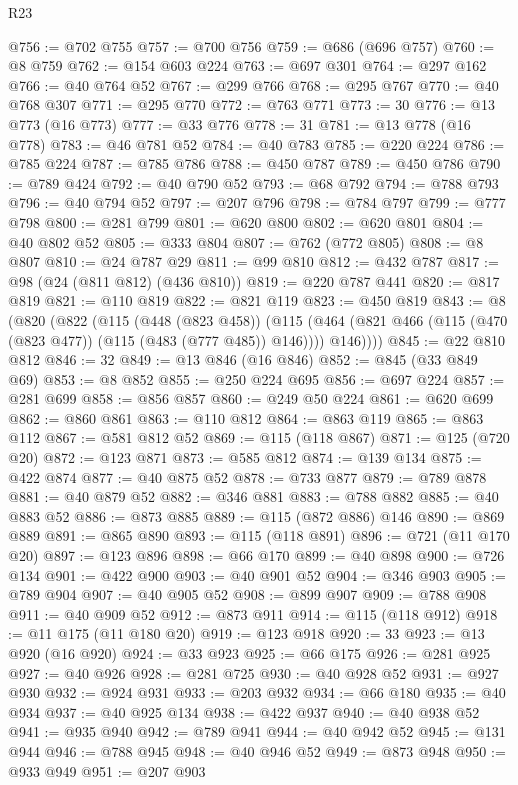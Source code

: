 \begin{lexlean}{R23}
\begin{coremodule}
@756 := @702 @755
@757 := @700 @756
@759 := @686 (@696 @757)
@760 := @8 @759
@762 := @154 @603 @224
@763 := @697 @301
@764 := @297 @162
@766 := @40 @764 @52
@767 := @299 @766
@768 := @295 @767
@770 := @40 @768 @307
@771 := @295 @770
@772 := @763 @771
@773 := 30
@776 := @13 @773 (@16 @773)
@777 := @33 @776
@778 := 31
@781 := @13 @778 (@16 @778)
@783 := @46 @781 @52
@784 := @40 @783
@785 := @220 @224
@786 := @785 @224
@787 := @785 @786
@788 := @450 @787
@789 := @450 @786
@790 := @789 @424
@792 := @40 @790 @52
@793 := @68 @792
@794 := @788 @793
@796 := @40 @794 @52
@797 := @207 @796
@798 := @784 @797
@799 := @777 @798
@800 := @281 @799
@801 := @620 @800
@802 := @620 @801
@804 := @40 @802 @52
@805 := @333 @804
@807 := @762 (@772 @805)
@808 := @8 @807
@810 := @24 @787 @29
@811 := @99 @810
@812 := @432 @787
@817 := @98 (@24 (@811 @812) (@436 @810))
@819 := @220 @787 @441
@820 := @817 @819
@821 := @110 @819
@822 := @821 @119
@823 := @450 @819
@843 := @8
    (@820
      (@822
        (@115
          (@448 (@823 @458))
          (@115 (@464 (@821 @466 (@115 (@470 (@823 @477)) (@115 (@483 (@777 @485)) @146)))) @146))))
@845 := @22 @810 @812
@846 := 32
@849 := @13 @846 (@16 @846)
@852 := @845 (@33 @849 @69)
@853 := @8 @852
@855 := @250 @224 @695
@856 := @697 @224
@857 := @281 @699
@858 := @856 @857
@860 := @249 @50 @224
@861 := @620 @699
@862 := @860 @861
@863 := @110 @812
@864 := @863 @119
@865 := @863 @112
@867 := @581 @812 @52
@869 := @115 (@118 @867)
@871 := @125 (@720 @20)
@872 := @123 @871
@873 := @585 @812
@874 := @139 @134
@875 := @422 @874
@877 := @40 @875 @52
@878 := @733 @877
@879 := @789 @878
@881 := @40 @879 @52
@882 := @346 @881
@883 := @788 @882
@885 := @40 @883 @52
@886 := @873 @885
@889 := @115 (@872 @886) @146
@890 := @869 @889
@891 := @865 @890
@893 := @115 (@118 @891)
@896 := @721 (@11 @170 @20)
@897 := @123 @896
@898 := @66 @170
@899 := @40 @898
@900 := @726 @134
@901 := @422 @900
@903 := @40 @901 @52
@904 := @346 @903
@905 := @789 @904
@907 := @40 @905 @52
@908 := @899 @907
@909 := @788 @908
@911 := @40 @909 @52
@912 := @873 @911
@914 := @115 (@118 @912)
@918 := @11 @175 (@11 @180 @20)
@919 := @123 @918
@920 := 33
@923 := @13 @920 (@16 @920)
@924 := @33 @923
@925 := @66 @175
@926 := @281 @925
@927 := @40 @926
@928 := @281 @725
@930 := @40 @928 @52
@931 := @927 @930
@932 := @924 @931
@933 := @203 @932
@934 := @66 @180
@935 := @40 @934
@937 := @40 @925 @134
@938 := @422 @937
@940 := @40 @938 @52
@941 := @935 @940
@942 := @789 @941
@944 := @40 @942 @52
@945 := @131 @944
@946 := @788 @945
@948 := @40 @946 @52
@949 := @873 @948
@950 := @933 @949
@951 := @207 @903

\end{coremodule}
\end{lexlean}
